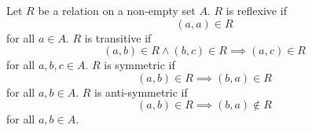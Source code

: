 
Let $R$ be a relation on
a non-empty set $A$.
$R$ is reflexive if
$$(a, a) \in R$$
for all $a \in A$.
$R$ is transitive if
$$(a, b) \in R \land (b, c) \in R \implies (a, c) \in R$$
for all $a, b, c \in A$.
$R$ is symmetric if
$$(a, b) \in R \implies (b, a) \in R$$
for all $a, b \in A$.
$R$ is anti-symmetric if
$$(a, b) \in R \implies (b, a) \not\in R$$
for all $a, b \in A$.
\strats
